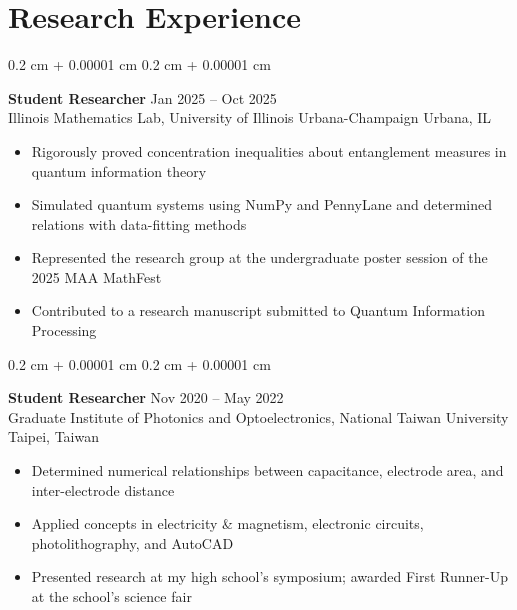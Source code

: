 \documentclass[10pt, letterpaper]{article}
\newenvironment{highlights}{
    \vspace*{2.5 pt}
    \begin{itemize}[
        topsep=0 cm,
        parsep=0 cm,
        partopsep=0pt,
        itemsep=2.5 pt,
        leftmargin=0.4 cm + 10pt
    ]
}{
    \end{itemize}
} %
\newenvironment{onecolentry}{
    \begin{adjustwidth}{
        0.2 cm + 0.00001 cm
    }{
        0.2 cm + 0.00001 cm
    }
}{
    \end{adjustwidth}
} %
\begin{document}
        \vspace{0.3 cm}


    \section{Research Experience}

        \begin{onecolentry}
            \textbf{Student Researcher} \hfill Jan 2025 -- Oct 2025 \\
            Illinois Mathematics Lab, University of Illinois Urbana-Champaign \hfill Urbana, IL
            
            \begin{highlights}
                \item Rigorously proved concentration inequalities about entanglement measures in quantum information theory
                \item Simulated quantum systems using NumPy and PennyLane and determined relations with data-fitting methods
                \item Represented the research group at the undergraduate poster session of the 2025 MAA MathFest
                \item Contributed to a research manuscript submitted to Quantum Information Processing
            \end{highlights}
        \end{onecolentry}

        \vspace{0.3 cm}

        \begin{onecolentry}
            \textbf{Student Researcher} \hfill Nov 2020 -- May 2022 \\
            Graduate Institute of Photonics and Optoelectronics, National Taiwan University \hfill Taipei, Taiwan
    
            \begin{highlights}
                \item Determined numerical relationships between capacitance, electrode area, and inter-electrode distance
                \item Applied concepts in electricity \& magnetism, electronic circuits, photolithography, and AutoCAD
                \item Presented research at my high school's symposium; awarded First Runner-Up at the school's science fair
            \end{highlights}
        \end{onecolentry}
\end{document}
